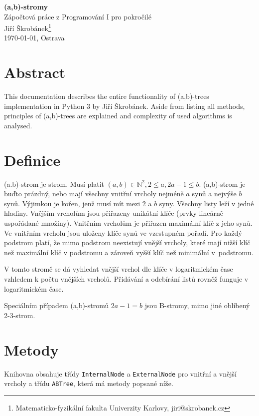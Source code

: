 \documentclass[a4paper,11pt,openany]{article}
\begin{document}
\begin{center}
{\huge \textbf{(a,b)-stromy}}\\\vspace{\baselineskip}Zápočtová práce z Programování I pro pokročilé\\
\vspace{10mm} {\large Jiří Škrobánek\footnote[1]{Matematicko-fyzikální fakulta Univerzity Karlovy, {\ttfamily jiri@skrobanek.cz}}}\\
\vspace{10mm}\today, Ostrava
\end{center}
	
\section*{Abstract}
	
This documentation describes the entire functionality of (a,b)-trees implementation in Python 3 by Jiří Škrobánek. Aside from listing all methods, principles of (a,b)-trees are explained and complexity of used algorithms is analysed.
	
\tableofcontents
	
\section{Definice}
(a.b)-strom je strom. Musí platit $(a,b) \in \mathbb{N}^2, 2 \leq a, 2a - 1 \leq b $. (a,b)-strom je buďto prázdný, nebo mají všechny vnitřní vrcholy nejméně $a$ synů a nejvýše $b$ synů. Výjimkou je kořen, jenž musí mít mezi 2 a $b$ syny. Všechny listy leží v jedné hladiny. Vnějším vrcholům jsou přiřazeny unikátní klíče (prvky lineárně uspořádané množiny). Vnitřním vrcholům je přiřazen maximální klíč z jeho synů. Ve vnitřním vrcholu jsou uloženy klíče synů ve vzestupném pořadí. Pro každý podstrom platí, že mimo podstrom neexistují vnější vrcholy, které mají nižší klíč než maximální klíč v podstromu a zároveň vyšší klíč než minimální v~podstromu.
	
V tomto stromě se dá vyhledat vnější vrchol dle klíče v logaritmickém čase vzhledem k počtu vnějších vrcholů. Přidávání a odebírání listů rovněž funguje v logaritmickém čase.
	
Speciálním případem (a,b)-stromů $2a-1=b$ jsou B-stromy, mimo jiné oblíbený 2-3-strom.
	
\section{Metody}
Knihovna obsahuje třídy \texttt{InternalNode} a \texttt{ExternalNode} pro vnitřní a vnější vrcholy a třídu \texttt{ABTree}, která má metody popsané níže.
	
\end{document}
